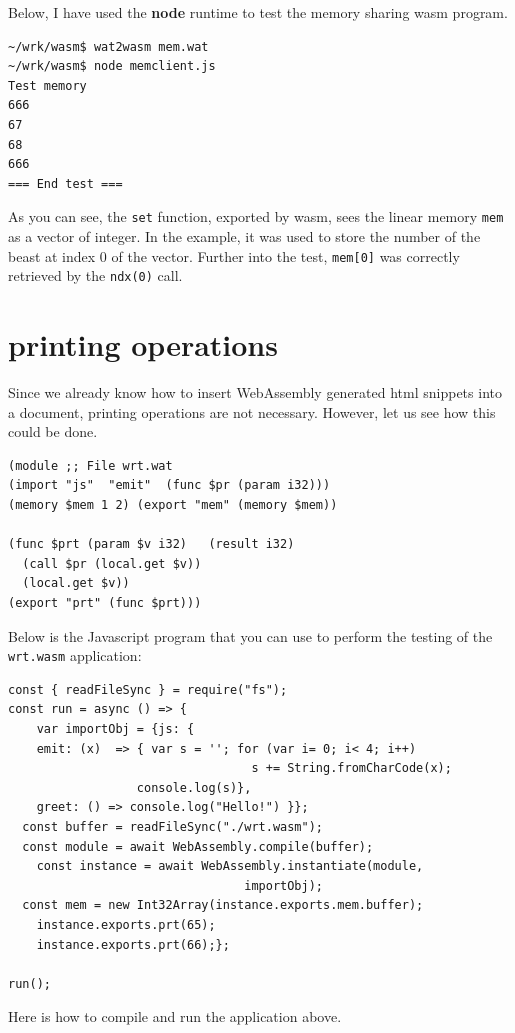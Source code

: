 \documentclass[a4paper,12pt]{book}
\begin{document}
Below, I have used the {\bf node} runtime to test the
memory sharing wasm program.

\begin{verbatim}
~/wrk/wasm$ wat2wasm mem.wat
~/wrk/wasm$ node memclient.js
Test memory
666
67
68
666
=== End test ===
\end{verbatim}

As you can see, the \verb|set| function, exported
by wasm, sees the linear memory \verb|mem| as
a vector of integer. In the example, it was used
to store the number of the beast at index 0 of
the vector. Further into the test, \verb|mem[0]|
was correctly retrieved by the \verb|ndx(0)| call.


\section{printing operations}

Since we already know how to insert WebAssembly
generated html snippets into a document, printing
operations are not necessary. However, let us see
how this could be done.

\begin{verbatim}
(module ;; File wrt.wat
(import "js"  "emit"  (func $pr (param i32)))
(memory $mem 1 2) (export "mem" (memory $mem))

(func $prt (param $v i32)   (result i32)
  (call $pr (local.get $v))
  (local.get $v))
(export "prt" (func $prt)))
\end{verbatim}

Below is the Javascript program that you can use
to perform the testing of the \verb|wrt.wasm|
application:

\begin{verbatim}
const { readFileSync } = require("fs");
const run = async () => {
    var importObj = {js: {
	emit: (x)  => { var s = ''; for (var i= 0; i< 4; i++)
	                              s += String.fromCharCode(x);
                  console.log(s)},
	greet: () => console.log("Hello!") }};
  const buffer = readFileSync("./wrt.wasm");
  const module = await WebAssembly.compile(buffer);
    const instance = await WebAssembly.instantiate(module, 
                                 importObj);
  const mem = new Int32Array(instance.exports.mem.buffer);
    instance.exports.prt(65);
    instance.exports.prt(66);};

run();
\end{verbatim}

Here is how to compile and run the application above.
\end{document}
